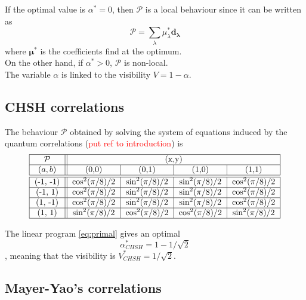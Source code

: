 If the optimal value is $\alpha^* = 0$, then  $\mathcal{P}$ is a local behaviour since it can be written as 
\begin{equation*}
    \mathcal{P} = \displaystyle \sum_\lambda \mu^*_\lambda \mathbf{d_\lambda}
\end{equation*}
where $\mathbf{\mu^*}$ is the coefficients find at the optimum. \\
On the other hand, if  $\alpha^* > 0$, $ \mathcal{P} $ is non-local.\\

The variable $\alpha$ is linked to the visibility $V = 1 - \alpha$. 

\subsection{CHSH correlations}\label{CHSH_primal}

The behaviour $\mathcal{P}$ obtained by solving the system of equations induced by the quantum correlations (\textcolor{red}{put ref to introduction}) is 
\begin{equation*}
    \begin{tabular}{|c||*{4}{c|}}\hline
  $\mathcal{P}$   & \multicolumn{4}{ c| }{(x,y)} \\
  \hline
$(a,b)$
&\makebox[3em]{(0,0)}&\makebox[3em]{(0,1)}&\makebox[3em]{(1,0)}&\makebox[3em]{(1,1)}\\\hline\hline

(-1, -1) &$\cos^2(\pi/8)/2$&$\sin^2(\pi/8)/2$&$\sin^2(\pi/8)/2$&$\cos^2(\pi/8)/2$\\
\hline
(-1, 1) &$\cos^2(\pi/8)/2$&$\sin^2(\pi/8)/2$&$\sin^2(\pi/8)/2$&$\cos^2(\pi/8)/2$
 \\ 
 \hline
(1, -1)& $\cos^2(\pi/8)/2$&$\sin^2(\pi/8)/2$&$\sin^2(\pi/8)/2$&$\cos^2(\pi/8)/2$
 \\\hline
(1, 1) & $\sin^2(\pi/8)/2$&$\cos^2(\pi/8)/2$&$\cos^2(\pi/8)/2$&$\sin^2(\pi/8)/2$\\ 
 \hline
    \end{tabular}
\end{equation*}


The linear program \ref{eq:primal} gives an optimal 
\begin{equation}
    \alpha^*_{CHSH} = 1 - 1/\sqrt{2}
\end{equation}, meaning that the visibility is $V^*_{CHSH} = 1/\sqrt{2}$.


\subsection{Mayer-Yao's correlations}


